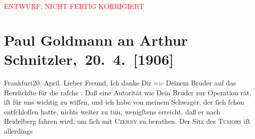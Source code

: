 
\begin{center}
            \textcolor{red}{ENTWURF, NICHT FERTIG KORRIGIERT}
                      \end{center}
            
         
         \renewcommand{\erwaehntePersonen}{Personen: Vincenz Czerny, Fedor Mamroth, Josef Rosengart, Julius Schnitzler}
         \renewcommand{\erwaehnteOrte}{Orte: Frankfurt am Main, Heidelberg, Wien}
         \renewcommand{\erwaehnteWerke}{}
               \section[ Paul Goldmann an Arthur Schnitzler, 20. 4. {[}1906{]}]{ Paul Goldmann an Arthur Schnitzler, 20. 4. {[}1906{]}}\nopagebreak{}\rehead{ }\begin{ledgroupsized}[t]{13cm}\normalsize\beginnumbering \toendnotes[C]{\smallbreak\pagebreak[2]} 
\toendnotes[C]{\smallbreak}\pstart
           \centering{}{\pb} Frankfurt20. April.\pend
           \pstart
           Lieber Freund, Ich danke Dir \textcolor{gray}{wie} Deinem Bruder auf das Herzlichſte für die raſche \label{K-L03244-1v}\label{K-L03244-1h}. Daß
               eine Autorität \strikeout{\textcolor{gray}{×}} wie Dein Bruder zur Operation  rät, iſt für uns wichtig zu wiſſen, und ich habe von
               meinem Schwager, der ſich ſchon entſchloſſen hatte,
               nichts weiter zu tun, wenigſtens erreicht, daß er nach Heidelberg fahren wird, um ſich mit \textsc{Czerny} zu berathen. Der Sitz des \textsc{Tumors} iſt allerdings 

\end{ledgroupsized}
